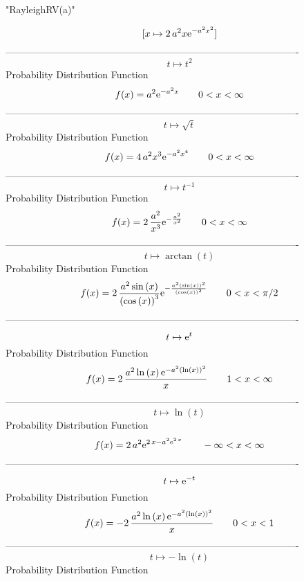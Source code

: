 \documentclass[12pt]{article}
\begin{document}
 
                               "RayleighRV(a)"

$$[x\mapsto 2\,{a}^{2}x{{\rm e}^{-{a}^{2}{x}^{2}}}]
$$-------------------------------------------------------------------------------------------  \\$$t\mapsto {t}^{2}
$$Probability Distribution Function 
$$  f(x)={a}^{2}{{\rm e}^{-{a}^{2}x}}
 \qquad0
 < x < \infty 
$$-------------------------------------------------------------------------------------------  \\$$t\mapsto \sqrt {t}
$$Probability Distribution Function 
$$  f(x)=4\,{a}^{2}{x}^{3}{{\rm e}^{-{a}^{2}{x}^{4}}}
 \qquad0
 < x < \infty 
$$-------------------------------------------------------------------------------------------  \\$$t\mapsto {t}^{-1}
$$Probability Distribution Function 
$$  f(x)=2\,{\frac {{a}^{2}}{{x}^{3}}{{\rm e}^{-{\frac {{a}^{2}}{{x}^{2}}}}}}
 \qquad0
 < x < \infty 
$$-------------------------------------------------------------------------------------------  \\$$t\mapsto \arctan \left( t \right) 
$$Probability Distribution Function 
$$  f(x)=2\,{\frac {{a}^{2}\sin \left( x \right) }{ \left( \cos \left( x
 \right)  \right) ^{3}}{{\rm e}^{-{\frac {{a}^{2} \left( \sin \left( x
 \right)  \right) ^{2}}{ \left( \cos \left( x \right)  \right) ^{2}}}}
}}
 \qquad0
 < x < \pi/2
$$-------------------------------------------------------------------------------------------  \\$$t\mapsto {{\rm e}^{t}}
$$Probability Distribution Function 
$$  f(x)=2\,{\frac {{a}^{2}\ln  \left( x \right) {{\rm e}^{-{a}^{2} \left( \ln 
 \left( x \right)  \right) ^{2}}}}{x}}
 \qquad1
 < x < \infty 
$$-------------------------------------------------------------------------------------------  \\$$t\mapsto \ln  \left( t \right) 
$$Probability Distribution Function 
$$  f(x)=2\,{a}^{2}{{\rm e}^{2\,x-{a}^{2}{{\rm e}^{2\,x}}}}
 \qquad-\infty 
 < x < \infty 
$$-------------------------------------------------------------------------------------------  \\$$t\mapsto {{\rm e}^{-t}}
$$Probability Distribution Function 
$$  f(x)=-2\,{\frac {{a}^{2}\ln  \left( x \right) {{\rm e}^{-{a}^{2} \left( 
\ln  \left( x \right)  \right) ^{2}}}}{x}}
 \qquad0
 < x < 1
$$-------------------------------------------------------------------------------------------  \\$$t\mapsto -\ln  \left( t \right) 
$$Probability Distribution Function 
\end{document}
